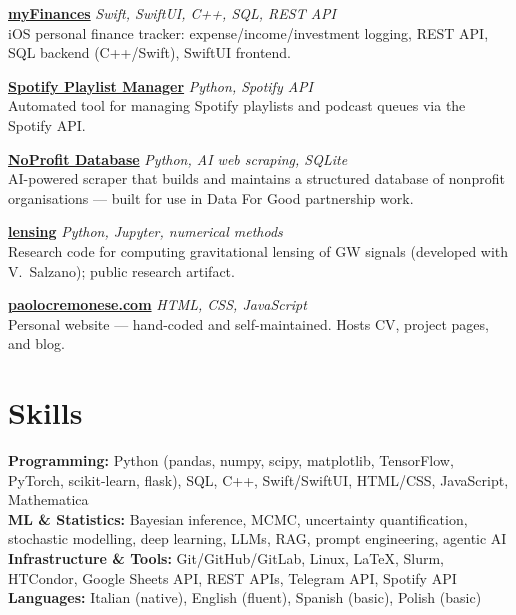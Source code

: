 \documentclass[10pt,a4paper]{article}
\begin{document}
\vspace{4pt}
\textbf{\href{https://github.com/PaoloCremo/myfinances}{myFinances}} \hfill \textit{Swift, SwiftUI, C++, SQL, REST API}\\
{\small iOS personal finance tracker: expense/income/investment logging, REST API, SQL backend
(C++/Swift), SwiftUI frontend.}

\vspace{4pt}
\textbf{\href{https://github.com/PaoloCremo/spotify}{Spotify Playlist Manager}} \hfill \textit{Python, Spotify API}\\
{\small Automated tool for managing Spotify playlists and podcast queues via the Spotify API.}

\vspace{4pt}
\textbf{\href{https://github.com/PaoloCremo/noProfit_dataBase}{NoProfit Database}} \hfill \textit{Python, AI web scraping, SQLite}\\
{\small AI-powered scraper that builds and maintains a structured database of nonprofit organisations —
built for use in Data For Good partnership work.}

\vspace{4pt}
\textbf{\href{https://github.com/PaoloCremo/lensing}{lensing}} \hfill \textit{Python, Jupyter, numerical methods}\\
{\small Research code for computing gravitational lensing of GW signals (developed with V.\ Salzano);
public research artifact.}

\vspace{4pt}
\textbf{\href{https://paolocremonese.com}{paolocremonese.com}} \hfill \textit{HTML, CSS, JavaScript}\\
{\small Personal website — hand-coded and self-maintained. Hosts CV, project pages, and blog.}

\section{Skills}

{\small
\textbf{Programming:} Python (pandas, numpy, scipy, matplotlib, TensorFlow, PyTorch, scikit-learn,
flask), SQL, C++, Swift/SwiftUI, HTML/CSS, JavaScript, Mathematica\\[2pt]
\textbf{ML \& Statistics:} Bayesian inference, MCMC, uncertainty quantification, stochastic modelling,
deep learning, LLMs, RAG, prompt engineering, agentic AI\\[2pt]
\textbf{Infrastructure \& Tools:} Git/GitHub/GitLab, Linux, \LaTeX, Slurm, HTCondor, Google Sheets API,
REST APIs, Telegram API, Spotify API\\[2pt]
\textbf{Languages:} Italian (native), English (fluent), Spanish (basic), Polish (basic)
}
\end{document}
